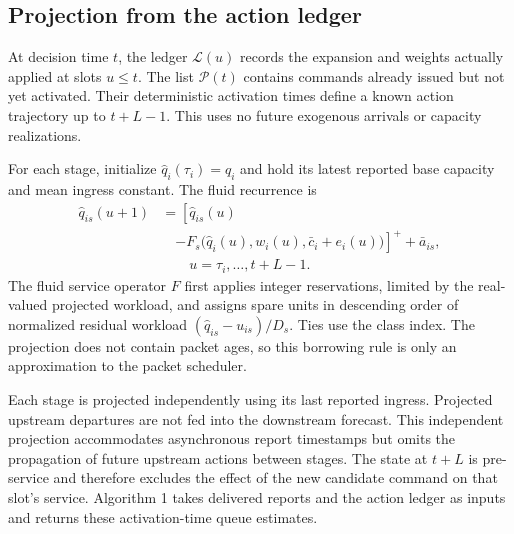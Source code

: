 \documentclass{IEEEoj}
\begin{document}
\subsection{Projection from the action ledger}
At decision time $t$, the ledger $\mathcal L(u)$ records the expansion and weights
actually applied at slots $u\le t$. The list $\mathcal P(t)$ contains commands
already issued but not yet activated. Their deterministic activation times
define a known action trajectory up to $t+L-1$. This uses no future exogenous
arrivals or capacity realizations.

For each stage, initialize $\widehat q_i(\tau_i)=q_i$ and hold its latest
reported base capacity and mean ingress constant. The fluid recurrence is
\begin{equation}
\begin{aligned}
 \widehat q_{is}(u+1)&=\left[\widehat q_{is}(u)\right.\\[-2pt]
 &\quad\left.-F_s\bigl(\widehat q_i(u),w_i(u),\bar c_i+e_i(u)\bigr)\right]^+
 +\bar a_{is},\\
 &\qquad u=\tau_i,\ldots,t+L-1.
\end{aligned}
\label{eq:project}
\end{equation}
The fluid service operator $F$ first applies integer reservations, limited by
the real-valued projected workload, and assigns spare units in descending order
of normalized residual workload $(\widehat q_{is}-u_{is})/D_s$. Ties use the class
index. The projection does not contain packet ages, so this borrowing rule is
only an approximation to the packet scheduler.

Each stage is projected independently using its last reported ingress.
Projected upstream departures are not fed into the downstream forecast.
This independent projection accommodates asynchronous report timestamps but omits the propagation of future upstream actions between stages. The state at $t+L$ is pre-service and therefore excludes the effect
of the new candidate command on that slot's service. Algorithm 1 takes delivered
reports and the action ledger as inputs and returns these activation-time
queue estimates.
\end{document}
